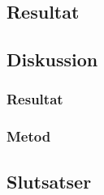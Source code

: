 \subsection{Resultat}
\subsection{Diskussion}
\subsubsection{Resultat}
\subsubsection{Metod}
\subsection{Slutsatser}
